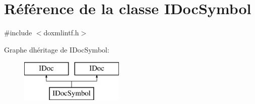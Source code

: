\hypertarget{class_i_doc_symbol}{}\section{Référence de la classe I\+Doc\+Symbol}
\label{class_i_doc_symbol}


{\ttfamily \#include $<$doxmlintf.\+h$>$}

Graphe d\textquotesingle{}héritage de I\+Doc\+Symbol\+:\begin{figure}[H]
\begin{center}
\leavevmode
\includegraphics[height=2.000000cm]{class_i_doc_symbol}
\end{center}
\end{figure}
